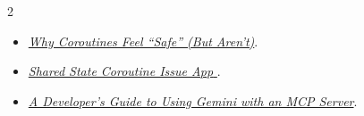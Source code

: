 \documentclass[10pt,a4paper,withhyper]{altacv}
\begin{document}
\begin{paracol}{2}





\begin{itemize}

	\item 	\href{https://medium.com/@slimaniiyassine/why-coroutines-feel-safe-but-arent-582a31ebe0d3}{\textit{Why Coroutines Feel “Safe” (But Aren’t)}}.
		
		\item	\href{https://github.com/slimaniiyassine/Medium-Article-Shared-State-Coroutine-Issue}{\textit{Shared State Coroutine Issue App
		}}.
		
	\item	\href{https://medium.com/@slimaniiyassine/a-developers-guide-to-using-gemini-with-an-mcp-server-05878c418097}{\textit{A Developer’s Guide to Using Gemini with an MCP Server}}.
	
	
\end{itemize}



\end{paracol}
\end{document}
